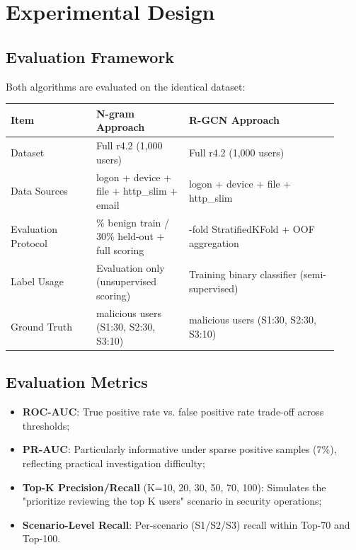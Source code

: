 \documentclass[
  a4paper,
  11pt]{article}
\newcounter{none} %
\providecommand{\tightlist}{%
  \setlength{\itemsep}{0pt}\setlength{\parskip}{0pt}}
\begin{document}
\section{Experimental Design}\label{experimental-design}

\subsection{Evaluation Framework}\label{evaluation-framework}

Both algorithms are evaluated on the identical dataset:

{\def\LTcaptype{none} %
\begin{longtable}[]{@{}>{\raggedright\arraybackslash}p{0.24\linewidth}>{\raggedright\arraybackslash}p{0.26\linewidth}>{\raggedright\arraybackslash}p{0.42\linewidth}@{}}
\toprule\noalign{}
Item & N-gram Approach & R-GCN Approach \\
\midrule\noalign{}
\endhead
\bottomrule\noalign{}
\endlastfoot
Dataset & Full r4.2 (1,000 users) & Full r4.2 (1,000 users) \\
Data Sources & logon + device + file + http\_slim + email & logon +
device + file + http\_slim \\
Evaluation Protocol & 70\% benign train / 30\% held-out + full scoring &
5-fold StratifiedKFold + OOF aggregation \\
Label Usage & Evaluation only (unsupervised scoring) & Training binary
classifier (semi-supervised) \\
Ground Truth & 70 malicious users (S1:30, S2:30, S3:10) & 70 malicious
users (S1:30, S2:30, S3:10) \\
\end{longtable}
}

\subsection{Evaluation Metrics}\label{evaluation-metrics}

\begin{itemize}
\tightlist
\item
  \textbf{ROC-AUC}: True positive rate vs. false positive rate trade-off
  across thresholds;
\item
  \textbf{PR-AUC}: Particularly informative under sparse positive
  samples (7\%), reflecting practical investigation difficulty;
\item
  \textbf{Top-K Precision/Recall} (K=10, 20, 30, 50, 70, 100): Simulates
  the "prioritize reviewing the top K users" scenario in security
  operations;
\item
  \textbf{Scenario-Level Recall}: Per-scenario (S1/S2/S3) recall within
  Top-70 and Top-100.
\end{itemize}
\end{document}
